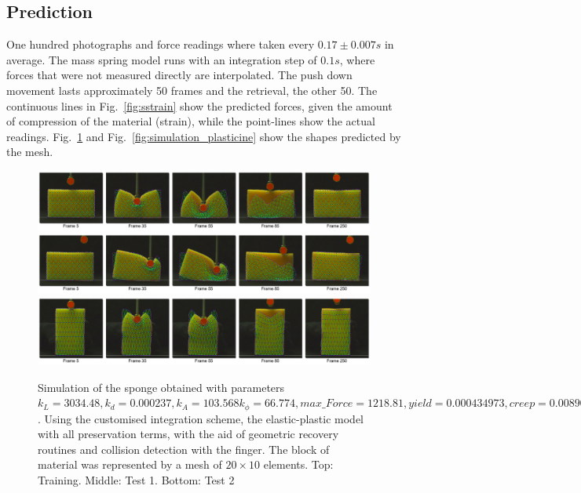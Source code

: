 \documentclass[journal]{IEEEtran}
\newcommand{\fref}[1]{Fig.~\ref{#1}}
\begin{document}
\subsection{Prediction}

One hundred photographs and force readings where taken every $0.17\pm0.007 s$ in average.  The mass spring model runs with an integration step of $0.1s$, where forces that were not measured directly are interpolated.  The push down movement lasts approximately 50 frames and the retrieval, the other 50.  The continuous lines in \fref{fig:sstrain} show the predicted forces, given the amount of compression of the material (strain), while the point-lines show the actual readings.  \fref{fig:simulation_sponge} and \fref{fig:simulation_plasticine} show the shapes predicted by the mesh.

\begin{figure}[!t]
\centering
\includegraphics[width=178mm]{arrio9}
\includegraphics[width=178mm]{arrio10}
\includegraphics[width=178mm]{arrio11}
\caption{Simulation of the sponge obtained with parameters $k_L=3034.48, k_d=0.000237, k_A=103.568 k_{\phi}=66.774, max\_Force=1218.81, yield=0.000434973, creep=0.00890343, max\_\alpha=0.45204$.  Using the customised integration scheme, the elastic-plastic model with all preservation terms, with the aid of geometric recovery routines and collision detection with the finger.  The block of material was represented by a mesh of $20 \times 10$ elements. Top: Training. Middle: Test 1. Bottom: Test 2}\label{fig:simulation_sponge}
\end{figure}
\end{document}
